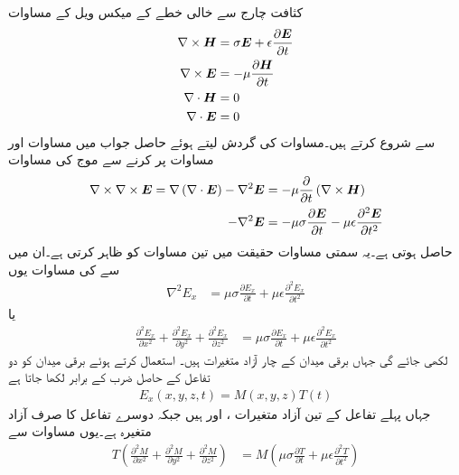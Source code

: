 کثافت چارج سے خالی  خطے کے میکس ویل کے مساوات
\begin{align}
\nabla \times {\ensuremath{{\boldsymbol{H}}}}&=\sigma {\ensuremath{{\boldsymbol{E}}}}+\epsilon \frac{\partial {\ensuremath{{\boldsymbol{E}}}}}{\partial t} \label{مساوات_مویج_مستطیلی_گھمکیا_الف}\\
\nabla \times {\ensuremath{{\boldsymbol{E}}}}&=-\mu \frac{\partial {\ensuremath{{\boldsymbol{H}}}}}{\partial t} \label{مساوات_مویج_مستطیلی_گھمکیا_ب}\\
\nabla \cdot {\ensuremath{{\boldsymbol{H}}}}&=0 \label{مساوات_مویج_مستطیلی_گھمکیا_پ}\\
\nabla \cdot {\ensuremath{{\boldsymbol{E}}}}&=0 \label{مساوات_مویج_مستطیلی_گھمکیا_ت}
\end{align}
 سے شروع کرتے ہیں۔مساوات  کی گردش لیتے ہوئے حاصل جواب میں مساوات  اور مساوات  پر کرنے سے موج کی مساوات 
\begin{align*}
\nabla \times \nabla \times {\ensuremath{{\boldsymbol{E}}}}=\nabla \left(\nabla \cdot {\ensuremath{{\boldsymbol{E}}}}\right)-\nabla^2 {{\boldsymbol{E}}}&=-\mu \frac{\partial }{\partial t}\left(\nabla \times {\ensuremath{{\boldsymbol{H}}}}\right)\\
-\nabla^2 {{\boldsymbol{E}}}&=-\mu \sigma \frac{\partial {\ensuremath{{\boldsymbol{E}}}}}{\partial t}-\mu\epsilon \frac{\partial^2 {{\boldsymbol{E}}}}{\partial t^2}
\end{align*}
حاصل ہوتی ہے۔یہ سمتی مساوات حقیقت میں تین مساوات کو ظاہر کرتی ہے۔ان میں سے   کی مساوات یوں
\begin{align*}
\nabla^2 E_x&=\mu \sigma \frac{\partial E_x}{\partial t}+\mu\epsilon \frac{\partial^2 E_x}{\partial t^2}
\end{align*}
یا
\begin{align}\label{مساوات_مویج_مستطیلی_گھمکیا_ٹ}
\frac{\partial^2 E_x}{\partial x^2}+\frac{\partial^2 E_x}{\partial y^2}+\frac{\partial^2 E_x}{\partial z^2}&=\mu \sigma \frac{\partial E_x}{\partial t}+\mu\epsilon \frac{\partial^2 E_x}{\partial t^2}
\end{align}
لکھی جائے گی جہاں برقی میدان  کے چار آزاد متغیرات ہیں۔ استعمال کرتے ہوئے  برقی میدان کو دو تفاعل کے حاصل ضرب کے برابر لکھا جاتا ہے
\begin{align}\label{مساوات_مویج_مستطیلی_گھمکیا_ث}
E_x(x,y,z,t)=M(x,y,z) T(t)
\end{align} 
جہاں پہلے تفاعل  کے تین آزاد متغیرات ،  اور  ہیں جبکہ دوسرے تفاعل  کا صرف  آزاد متغیرہ ہے۔یوں مساوات  سے
\begin{align*}
T\left(\frac{\partial^2 M}{\partial x^2}+\frac{\partial^2 M}{\partial y^2}+\frac{\partial^2 M}{\partial z^2}\right)&=M\left(\mu \sigma \frac{\partial T}{\partial t}+\mu\epsilon \frac{\partial^2 T}{\partial t^2}\right)
\end{align*}
